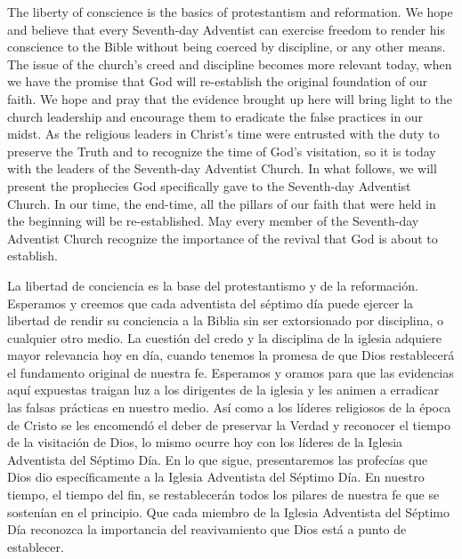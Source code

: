 The liberty of conscience is the basics of protestantism and reformation. We hope and believe that every Seventh-day Adventist can exercise freedom to render his conscience to the Bible without being coerced by discipline, or any other means. The issue of the church's creed and discipline becomes more relevant today, when we have the promise that God will re-establish the original foundation of our faith. We hope and pray that the evidence brought up here will bring light to the church leadership and encourage them to eradicate the false practices in our midst. As the religious leaders in Christ’s time were entrusted with the duty to preserve the Truth and to recognize the time of God’s visitation, so it is today with the leaders of the Seventh-day Adventist Church. In what follows, we will present the prophecies God specifically gave to the Seventh-day Adventist Church. In our time, the end-time, all the pillars of our faith that were held in the beginning will be re-established. May every member of the Seventh-day Adventist Church recognize the importance of the revival that God is about to establish.


La libertad de conciencia es la base del protestantismo y de la reformación. Esperamos y creemos que cada adventista del séptimo día puede ejercer la libertad de rendir su conciencia a la Biblia sin ser extorsionado por disciplina, o cualquier otro medio. La cuestión del credo y la disciplina de la iglesia adquiere mayor relevancia hoy en día, cuando tenemos la promesa de que Dios restablecerá el fundamento original de nuestra fe. Esperamos y oramos para que las evidencias aquí expuestas traigan luz a los dirigentes de la iglesia y les animen a erradicar las falsas prácticas en nuestro medio. Así como a los líderes religiosos de la época de Cristo se les encomendó el deber de preservar la Verdad y reconocer el tiempo de la visitación de Dios, lo mismo ocurre hoy con los líderes de la Iglesia Adventista del Séptimo Día. En lo que sigue, presentaremos las profecías que Dios dio específicamente a la Iglesia Adventista del Séptimo Día. En nuestro tiempo, el tiempo del fin, se restablecerán todos los pilares de nuestra fe que se sostenían en el principio. Que cada miembro de la Iglesia Adventista del Séptimo Día reconozca la importancia del reavivamiento que Dios está a punto de establecer.






